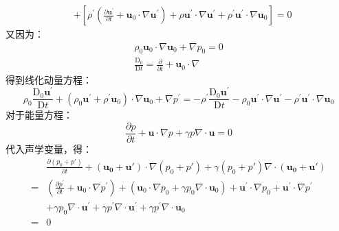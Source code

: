 \begin{enumerate}
\begin{equation}
\begin{aligned}
                &+\left[\rho^{\prime}\left(\frac{\partial \mathbf{u}^{\prime}}{\partial t}+\mathbf{u}_{0} \cdot \nabla \mathbf{u}^{\prime}\right)+\rho \mathbf{u}^{\prime} \cdot \nabla \mathbf{u}^{\prime}+\rho^{\prime} \mathbf{u}^{\prime} \cdot \nabla \mathbf{u}_{0}\right]
                = 0
            \end{aligned}
        \end{equation}
        又因为：
        \begin{gather}
            \rho_{0} \mathbf{u}_{0} \cdot \nabla \mathbf{u}_{0}+\nabla p_{0}=0 \\
            \frac{\mathrm{D}_{0}}{\mathrm{D} t}=\frac{\partial}{\partial t}+\mathbf{u}_{0} \cdot \nabla
        \end{gather}
        得到线化动量方程：
        \begin{equation}
            \rho_{0} \frac{\mathrm{D}_{0} \mathbf{u}^{\prime}}{\mathrm{D} t}+\left(\rho_{0} \mathbf{u}^{\prime}+\rho^{\prime} \mathbf{u}_{0}\right) \cdot \nabla \mathbf{u}_{0}+\nabla p^{\prime}
            =-\rho^{\prime} \frac{\mathrm{D}_{0} \mathbf{u}^{\prime}}{\mathrm{D} t}-\rho_{0} \mathbf{u}^{\prime} \cdot \nabla \mathbf{u}^{\prime}-\rho^{\prime} \mathbf{u}^{\prime} \cdot \nabla \mathbf{u}_{0}
        \end{equation}
        对于能量方程：
        \begin{equation}
            \frac{\partial p}{\partial t}+\mathbf{u} \cdot \nabla p+\gamma p \nabla \cdot \mathbf{u}=0
        \end{equation}
        代入声学变量，得：
        \begin{equation}
            \begin{aligned}
                & \frac{\partial (p_{0}  + p \prime )}{\partial t}+\mathbf{(\boldsymbol{u}_{0}+ \boldsymbol{u} \prime)} \cdot \nabla (p_{0}  + p \prime )+\gamma (p_{0}  + p \prime ) \nabla \cdot \mathbf{(\boldsymbol{u}_{0}+ \boldsymbol{u} \prime)} \\
                =& \left(\frac{\partial p^{\prime}}{\partial t}+\mathbf{u}_{0} \cdot \nabla p^{\prime}\right)+\left(\mathbf{u}_{0} \cdot \nabla p_{0}+\gamma p_{0} \nabla \cdot \mathbf{u}_{0}\right)+\mathbf{u}^{\prime} \cdot \nabla p_{0}+\mathbf{u}^{\prime} \cdot \nabla p^{\prime} \\
                & +\gamma p_{0} \nabla \cdot \mathbf{u}^{\prime}+\gamma p^{\prime} \nabla \cdot \mathbf{u}^{\prime}+\gamma p^{\prime} \nabla \cdot \mathbf{u}_{0} \\
                =& 0

\end{aligned}
\end{equation}
\end{enumerate}
